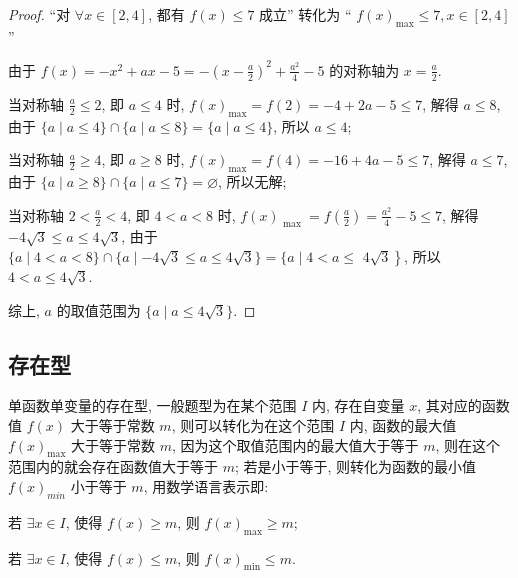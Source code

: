 \begin{proof}
  “对 \(\forall x \in  \left\lbrack  {2, 4}\right\rbrack\), 都有 \(f(x)  \leq  7\) 成立” 转化为 “ \(f{(x) }_{\max } \leq  7, x \in  \left\lbrack  {2, 4}\right\rbrack\) ”

由于 \(f(x)  = -{x}^{2} + {ax}-5 = -{\left( x-\frac{a}{2}\right) }^{2} + \frac{{a}^{2}}{4}-5\) 的对称轴为 \(x = \frac{a}{2}\).

当对称轴 \(\frac{a}{2} \leq  2\), 即 \(a \leq  4\) 时, \(f{(x) }_{\max } = f\left( 2\right)  = -4 + {2a}-5 \leq  7\), 解得 \(a \leq  8\), 由于 \(\{ a \mid  a \leq  4\}  \cap  \{ a \mid  a \leq  8\}  = \{ a \mid  a \leq  4\}\), 所以 \(a \leq  4\);

当对称轴 \(\frac{a}{2} \geq  4\), 即 \(a \geq  8\) 时, \(f{(x) }_{\max } = f\left( 4\right)  = -{16} + {4a}-5 \leq  7\), 解得 \(a \leq  7\), 由于 \(\{ a \mid  a \geq  8\}  \cap  \{ a \mid  a \leq  7\}  = \varnothing\), 所以无解;

当对称轴 \(2 < \frac{a}{2} < 4\), 即 \(4 < a < 8\) 时, \(f{(x) }_{\text{ max }} = f\left( \frac{a}{2}\right)  = \frac{{a}^{2}}{4}-5 \leq  7\), 解得 \(-4\sqrt{3} \leq  a \leq  4\sqrt{3}\), 由于 \(\{ a \mid  4 < a < 8\}  \cap  \{ a \mid  -4\sqrt{3} \leq  a \leq  4\sqrt{3}\}  = \{ a \mid  4 < a \leq\)  \(\left. {4\sqrt{3}}\right\}\), 所以 \(4 < a \leq  4\sqrt{3}\).

综上, \(a\) 的取值范围为 \(\{ a \mid  a \leq  4\sqrt{3}\}\).
\end{proof}

\subsection{存在型}\label{subsec:存在型}
单函数单变量的存在型, 一般题型为在某个范围 \(I\) 内, 存在自变量 \(x\), 其对应的函数值 \(f(x)\) 大于等于常数 \(m\), 则可以转化为在这个范围 \(I\) 内, 函数的最大值 \(f{(x) }_{\max }\) 大于等于常数 \(m\), 因为这个取值范围内的最大值大于等于 \(m\), 则在这个范围内的就会存在函数值大于等于 \(m\); 若是小于等于, 则转化为函数的最小值 \(f{(x) }_{min}\) 小于等于 \(m\), 用数学语言表示即:

\begin{type}\label{type:3}
  若 \(\exists x \in  I\), 使得 \(f(x)  \geq  m\), 则 \(f{(x) }_{\max } \geq  m\);
\end{type}

\begin{type}\label{type:4}
  若 \(\exists x \in  I\), 使得 \(f(x)  \leq  m\), 则 \(f{(x) }_{\min } \leq  m\).
\end{type}

